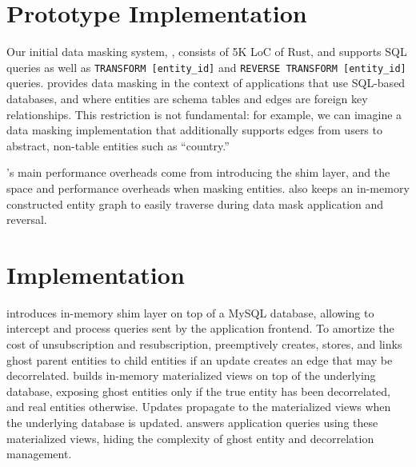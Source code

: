 \section{Prototype Implementation}
\label{sec:proto}
Our initial data masking system, \sys, consists of 5K LoC of Rust, and supports SQL queries as well
as \texttt{TRANSFORM [entity\_id]} and \texttt{REVERSE TRANSFORM [entity\_id]} queries.
\sys provides data masking in the context of applications that use SQL-based databases, and where
entities are schema tables and edges are foreign key relationships. 
%
This restriction is not fundamental: for example, we can imagine a data masking implementation that
additionally supports edges from \eg users to abstract, non-table entities such as ``country.''

\sys's main performance overheads come from introducing the shim layer, and the space and performance overheads when
masking entities. \sys also keeps an in-memory constructed entity graph to easily traverse
during data mask application and reversal.

%
\iffalse
\section{Implementation}

\name introduces in-memory shim layer on top of a MySQL database, 
allowing \name to intercept and process queries sent by the application frontend. 
To amortize the cost of unsubscription and resubscription, \name preemptively creates, stores, and
links ghost parent entities to child entities if an update creates an edge that may be decorrelated.
\name builds in-memory materialized views on top of the underlying database, exposing ghost
entities only if the true entity has been decorrelated, and real entities otherwise. Updates
propagate to the materialized views when the underlying database is updated. \name answers
application queries using these materialized views, hiding the complexity of ghost entity and
decorrelation management.

